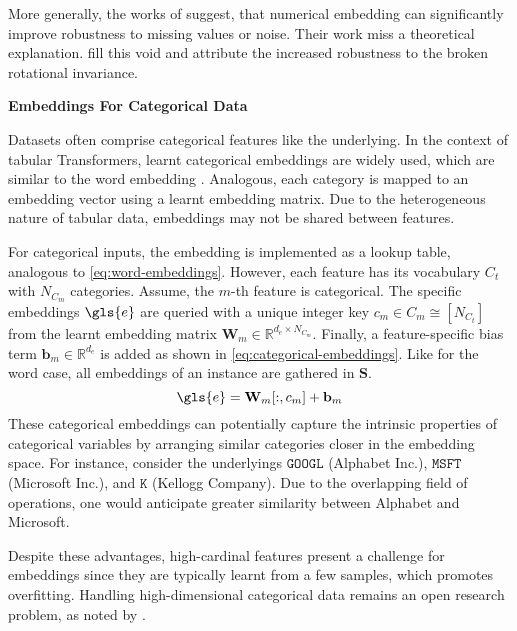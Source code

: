 More generally, the works of \textcites[][1]{gorishniyEmbeddingsNumericalFeatures2022}[][1]{somepalliSaintImprovedNeural2021} suggest, that numerical embedding can significantly improve robustness to missing values or noise. Their work miss a theoretical explanation. \textcite[][8--9]{grinsztajnWhyTreebasedModels2022} fill this void and attribute the increased robustness to the broken rotational invariance.

\textbf{Embeddings For Categorical Data}

Datasets often comprise categorical features like the underlying. In the context of tabular Transformers, learnt categorical embeddings are widely used, which are similar to the word embedding
\autocites[][4]{gorishniyRevisitingDeepLearning2021}[][2]{huangTabTransformerTabularData2020}[][4]{somepalliSaintImprovedNeural2021}. Analogous, each category is mapped to an embedding vector using a learnt embedding matrix. Due to the heterogeneous nature of tabular data, embeddings may not be shared between features.

For categorical inputs, the embedding is implemented as a lookup table, analogous to \cref{eq:word-embeddings}. However, each feature has
its vocabulary $C_t$ with $N_{C_m}$ categories. Assume, the $m$-th feature is categorical. The specific embeddings $\gls{e}$ are queried with a unique integer key $c_{m} \in C_m \cong\left[N_{C_t}\right]$ from the learnt embedding matrix $\mathbf{W}_m \in \mathbb{R}^{d_e \times N_{C_m}}$. Finally, a feature-specific bias term $\mathbf{b}_m \in \mathbb{R}^{d_{e}}$ is added as shown in \cref{eq:categorical-embeddings}. Like for the word case, all embeddings of an instance are gathered in $\mathbf{S}$.
\begin{equation}
    \gls{e}=\mathbf{W}_m[:,c_{m}] +\mathbf{b}_m
    \label{eq:categorical-embeddings}
\end{equation}
These categorical embeddings can potentially capture the intrinsic properties of categorical variables by arranging similar categories closer in the embedding space. For instance, consider the underlyings $\mathtt{GOOGL}$ (Alphabet Inc.), $\mathtt{MSFT}$ (Microsoft Inc.), and $\mathtt{K}$ (Kellogg Company). Due to the overlapping field of operations, one would anticipate greater similarity between Alphabet and Microsoft.

Despite these advantages, high-cardinal features present a challenge for embeddings since they are typically learnt from a few samples, which promotes \gls{overfitting}. Handling high-dimensional categorical data remains an open research problem, as noted by \textcite[][2]{borisovDeepNeuralNetworks2022}.

